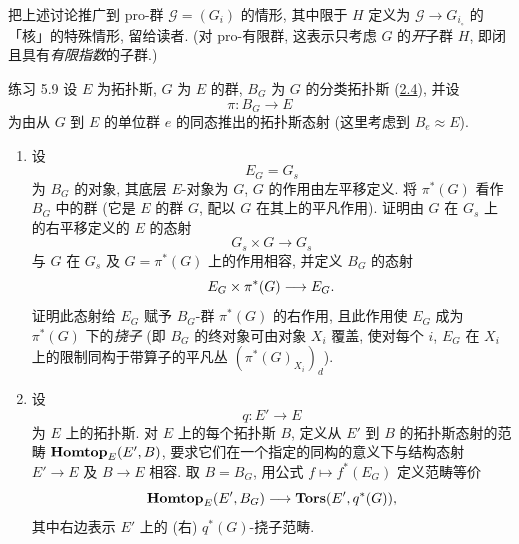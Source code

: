 \subsubsection{}
把上述讨论推广到 pro-群 $𝒢=(G_i)$ 的情形, 其中限于 $H$ 定义为 $𝒢\rightarrow G_{i_{\circ}}$ 的「核」的特殊情形, 留给读者. (对 pro-有限群, 这表示只考虑 $G$ 的\emph{开}子群 $H$, 即闭且具有\emph{有限指数}的子群.)



\begin{enonce*}[remark]{练习 5.9}
设 $E$ 为拓扑斯, $G$ 为 $E$ 的群, $B_G$ 为 $G$ 的分类拓扑斯 (\hyperref[IV.subsec2.4]{2.4}), 并设
$$
\pi:B_G\longrightarrow E
$$
为由从 $G$ 到 $E$ 的单位群 $e$ 的同态推出的拓扑斯态射 (这里考虑到 $B_e\approx E$).
\begin{enumerate}
\renewcommand{\theenumi}{\alph{enumi}}
\renewcommand{\labelenumi}{\theenumi)}
\item 设
$$
E_G=G_s
$$
为 $B_G$ 的对象, 其底层 $E$-对象为 $G$, $G$ 的作用由左平移定义. 将 $\pi^{\ast}(G)$ 看作 $B_G$ 中的群 (它是 $E$ 的群 $G$, 配以 $G$ 在其上的平凡作用). 证明由 $G$ 在 $G_s$ 上的右平移定义的 $E$ 的态射
$$
G_s\times G\longrightarrow G_s
$$
与 $G$ 在 $G_s$ 及 $G=\pi^{\ast}(G)$ 上的作用相容, 并定义 $B_G$ 的态射
$$
E_G\times \pi^{\ast}(G)\longrightarrow E_G{}.
$$
证明此态射给 $E_G$ 赋予 $B_G$-群 $\pi^{\ast}(G)$ 的右作用, 且此作用使 $E_G$ 成为 $\pi^{\ast}(G)$ 下的\pageoriginale \emph{挠子} (即 $B_G$ 的终对象可由对象 $X_i$ 覆盖, 使对每个 $i$, $E_G$ 在 $X_i$ 上的限制同构于带算子的平凡丛 $(\pi^{\ast}(G)_{X_i})_d$).

\item 设
$$
q:E'\longrightarrow E
$$
为 $E$ 上的拓扑斯. 对 $E$ 上的每个拓扑斯 $B$, 定义从 $E'$ 到 $B$ 的拓扑斯态射的范畴 $\operatorname{\mathbf{Homtop}}_E(E',B)$, 要求它们在一个指定的同构的意义下与结构态射 $E'\rightarrow E$ 及 $B\rightarrow E$ 相容. 取 $B=B_G$, 用公式 $f\mapsto f^{\ast}(E_G)$ 定义范畴等价
$$
\operatorname{\mathbf{Homtop}}_E(E',B_G)\longrightarrow \operatorname{\mathbf{Tors}}(E',q^{\ast}(G)){},
$$
其中右边表示 $E'$ 上的 (右) $q^{\ast}(G)$-挠子范畴.


\end{enumerate}
\end{enonce*}
